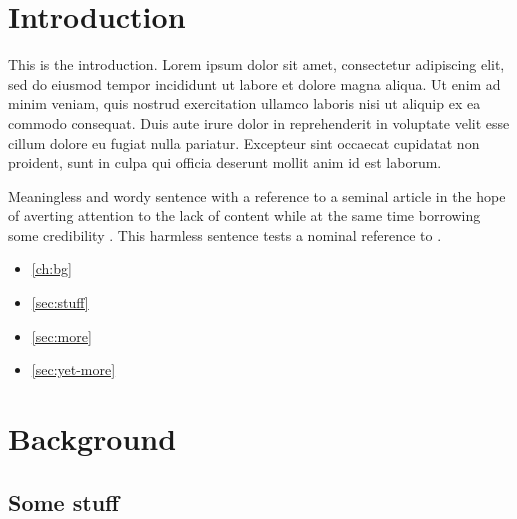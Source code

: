 \documentclass[english]{ufsc-thesis-rn46-2019}
\begin{document}
\pretextual%
\imprimircapa%
\imprimirfolhaderosto*
\clearpage %

\clearpage
\imprimirfolhadecertificacao
\tableofcontents*%
\textual%
\cleardoublepage

\chapter{Introduction}

This is the introduction. Lorem ipsum dolor sit amet, consectetur adipiscing elit, sed do eiusmod tempor incididunt ut labore et dolore magna aliqua. Ut enim ad minim veniam, quis nostrud exercitation ullamco laboris nisi ut aliquip ex ea commodo consequat. Duis aute irure dolor in reprehenderit in voluptate velit esse cillum dolore eu fugiat nulla pariatur. Excepteur sint occaecat cupidatat non proident, sunt in culpa qui officia deserunt mollit anim id est laborum.

Meaningless and wordy sentence with a reference to a seminal article in the hope of averting attention to the lack of content while at the same time borrowing some credibility \cite{turing1937computable}. This harmless sentence tests a nominal reference to .

\begin{itemize}
\item \autoref{ch:bg}
\item \autoref{sec:stuff}
\item \autoref{sec:more}
\item \autoref{sec:yet-more}
\end{itemize}

\lipsum[1]

\chapter{Background}
\label{ch:bg}

\lipsum[1]

\section{Some stuff}
\label{sec:stuff}

\lipsum[1]
\end{document}
